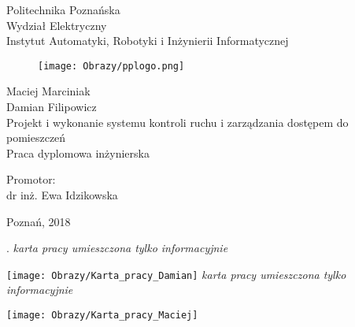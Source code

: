 \documentclass[twoside,10pt]{article}
\title{\TytulPolski}
\author{\StudentA}
\def\TytulPolski    {Projekt i wykonanie systemu kontroli ruchu i zarządzania dostępem do pomieszczeń}
\def\Promotor    {dr inż. Ewa Idzikowska}
\def\StudentA     {Maciej Marciniak}
\def\StudentB     {Damian Filipowicz}
\begin{document}
\thispagestyle{empty}
\setcounter{page}{0}
\begin{center}
\vspace{-10mm}
Politechnika Poznańska\\
Wydział Elektryczny\\  
Instytut Automatyki, Robotyki i Inżynierii Informatycznej\\
\vspace{8mm}
\begin{figure}[ht!]
\centering
\texttt{[image: Obrazy/pplogo.png]}
\end{figure}
\vspace{8mm}
\Large{\StudentA}\\
\Large{\StudentB}\\
\vspace{10mm}
\LARGE{\TytulPolski}\\
\vspace{10mm}
\Large{Praca dyplomowa inżynierska}\\
\end{center}
\vspace{40mm}
\begin{flushright}
{\large Promotor:\\
\Promotor}
\end{flushright}

\vspace{15mm}
\begin{center}
Poznań, 2018
\end{center}


\newpage
{\tiny .}
\thispagestyle{empty}
\setcounter{page}{0}
\newpage
\textit{karta pracy umieszczona tylko informacyjnie}

\texttt{[image: Obrazy/Karta\_pracy\_Damian]}
\newpage
\textit{karta pracy umieszczona tylko informacyjnie}

\texttt{[image: Obrazy/Karta\_pracy\_Maciej]}
\end{document}
